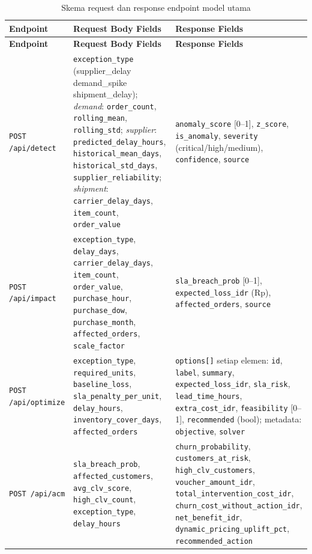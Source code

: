 \documentclass[12pt,a4paper]{article}
\begin{document}
\footnotesize
\begin{longtable}{>{\raggedright\arraybackslash}p{3.5cm}
                  >{\raggedright\arraybackslash}p{5.6cm}
                  >{\raggedright\arraybackslash}p{5.0cm}}
  \caption{Skema request dan response endpoint model utama} \label{tab:api-detail} \\
  \toprule
  \textbf{Endpoint} & \textbf{Request Body Fields} & \textbf{Response Fields} \\
  \midrule
  \endfirsthead
  \toprule
  \textbf{Endpoint} & \textbf{Request Body Fields} & \textbf{Response Fields} \\
  \midrule
  \endhead
  \bottomrule
  \endfoot
  \texttt{POST /api/detect}
    & \texttt{exception\_type} (supplier\_delay \textbar{} demand\_spike \textbar{} shipment\_delay);
      \textit{demand}: \texttt{order\_count}, \texttt{rolling\_mean}, \texttt{rolling\_std};
      \textit{supplier}: \texttt{predicted\_delay\_hours}, \texttt{historical\_mean\_days}, \texttt{historical\_std\_days}, \texttt{supplier\_reliability};
      \textit{shipment}: \texttt{carrier\_delay\_days}, \texttt{item\_count}, \texttt{order\_value}
    & \texttt{anomaly\_score} [0--1], \texttt{z\_score}, \texttt{is\_anomaly}, \texttt{severity} (critical/high/medium), \texttt{confidence}, \texttt{source} \\[4pt]
  \texttt{POST /api/impact}
    & \texttt{exception\_type}, \texttt{delay\_days}, \texttt{carrier\_delay\_days}, \texttt{item\_count}, \texttt{order\_value}, \texttt{purchase\_hour}, \texttt{purchase\_dow}, \texttt{purchase\_month}, \texttt{affected\_orders}, \texttt{scale\_factor}
    & \texttt{sla\_breach\_prob} [0--1], \texttt{expected\_loss\_idr} (Rp), \texttt{affected\_orders}, \texttt{source} \\[4pt]
  \texttt{POST /api/optimize}
    & \texttt{exception\_type}, \texttt{required\_units}, \texttt{baseline\_loss}, \texttt{sla\_penalty\_per\_unit}, \texttt{delay\_hours}, \texttt{inventory\_cover\_days}, \texttt{affected\_orders}
    & \texttt{options[]} setiap elemen: \texttt{id}, \texttt{label}, \texttt{summary}, \texttt{expected\_loss\_idr}, \texttt{sla\_risk}, \texttt{lead\_time\_hours}, \texttt{extra\_cost\_idr}, \texttt{feasibility} [0--1], \texttt{recommended} (bool); metadata: \texttt{objective}, \texttt{solver} \\[4pt]
  \texttt{POST /api/acm}
    & \texttt{sla\_breach\_prob}, \texttt{affected\_customers}, \texttt{avg\_clv\_score}, \texttt{high\_clv\_count}, \texttt{exception\_type}, \texttt{delay\_hours}
    & \texttt{churn\_probability}, \texttt{customers\_at\_risk}, \texttt{high\_clv\_customers}, \texttt{voucher\_amount\_idr}, \texttt{total\_intervention\_cost\_idr}, \texttt{churn\_cost\_without\_action\_idr}, \texttt{net\_benefit\_idr}, \texttt{dynamic\_pricing\_uplift\_pct}, \texttt{recommended\_action} \\[4pt]

\end{longtable}
\end{document}

